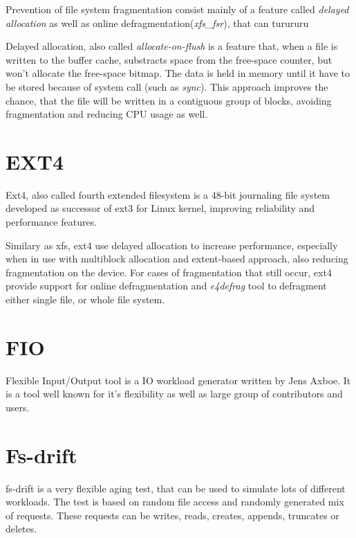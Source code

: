 \documentclass[
  color, %
  table, %
  lof,   %
  lot,   %
]{fithesis3}
\begin{document}
Prevention of file system fragmentation consist mainly of a feature called \textit{delayed allocation} as well as online defragmentation(\textit{xfs\_fsr}), that can turururu

Delayed allocation, also called \textit{allocate-on-flush} is a feature that, when a file is written to the buffer cache, substracts space from the free-space counter, but won't allocate the free-space bitmap. The data is held in memory until it have to be stored because of system call (such as \textit{sync}). This approach improves the chance, that the file will be written in a contiguous group of blocks, avoiding fragmentation and reducing CPU usage as well.

\section{EXT4}
Ext4, also called fourth extended filesystem is a 48-bit journaling file system developed as successor of ext3 for Linux kernel, improving reliability and performance features.



Similary as xfs, ext4 use delayed allocation to increase performance, especially when in use with multiblock allocation and extent-based approach, also reducing fragmentation on the device. For cases of fragmentation that still occur, ext4 provide support for online defragmentation and \textit{e4defrag} tool to defragment either single file, or whole file system.

\section{FIO}
Flexible Input/Output tool is a IO workload generator written by Jens Axboe. It is a tool well known for it's flexibility as well as large group of contributors and users.

\section{Fs-drift}
fs-drift is a very flexible aging test, that can be used to simulate lots of different workloads. The test is based on random file access and randomly generated mix of requests. These requests can be writes, reads, creates, appends, truncates or deletes.
\end{document}
